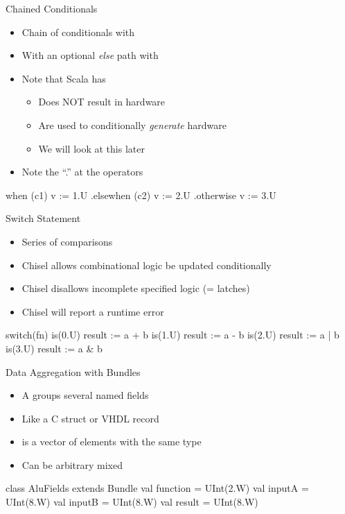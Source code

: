 \begin{frame}[fragile]{Chained Conditionals}
\begin{itemize}
\item Chain of conditionals with 
\item With an optional \emph{else} path with 
\item Note that Scala has 
\begin{itemize}
\item Does NOT result in hardware
\item Are used to conditionally \emph{generate} hardware
\item We will look at this later
\end{itemize}
\item Note the ``.'' at the operators
\end{itemize}
\begin{chisel}
  when (c1) { v := 1.U }
  .elsewhen (c2) { v := 2.U }
  .otherwise { v := 3.U }
\end{chisel}
\end{frame}

\begin{frame}[fragile]{Switch Statement}
\begin{itemize}
\item Series of comparisons
\item Chisel allows combinational logic be updated conditionally 
\item Chisel disallows incomplete specified logic (= latches)
\item Chisel will report a runtime error
\end{itemize}
\begin{chisel}
  switch(fn) {
    is(0.U) { result := a + b }
    is(1.U) { result := a - b }
    is(2.U) { result := a | b }
    is(3.U) { result := a & b }
  }
\end{chisel}
\end{frame}


\begin{frame}[fragile]{Data Aggregation with Bundles}
\begin{itemize}
\item A  groups several named fields
\item Like a C struct or VHDL record
\item {} is a vector of elements with the same type
\item Can be arbitrary mixed
\end{itemize}
\begin{chisel}
class AluFields extends Bundle {
  val function = UInt(2.W)
  val inputA = UInt(8.W)
  val inputB = UInt(8.W)
  val result = UInt(8.W)
}
\end{chisel}
\end{frame}

